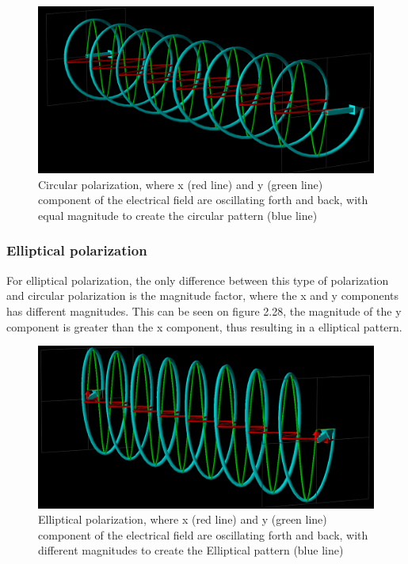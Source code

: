 \begin{figure}[h]
\centering
\includegraphics[scale=0.3]{figures/DetailedRightHandPolarization.PNG}
\caption{Circular polarization, where x (red line) and y (green line) component of the electrical field are oscillating forth and back, with equal magnitude to create the circular pattern (blue line)}
\end{figure}

\subsubsection{Elliptical polarization}
For elliptical polarization, the only difference between this type of polarization and circular polarization is the magnitude factor, where the x and y components has different magnitudes. This can be seen on figure 2.28, the magnitude of the y component is greater than the x component, thus resulting in a elliptical pattern.

\begin{figure}[h]
\centering
\includegraphics[scale=0.3]{figures/ellipticalPolarization.PNG}
\caption{Elliptical polarization, where x (red line) and y (green line) component of the electrical field are oscillating forth and back, with different magnitudes to create the Elliptical pattern (blue line)}
\end{figure}

